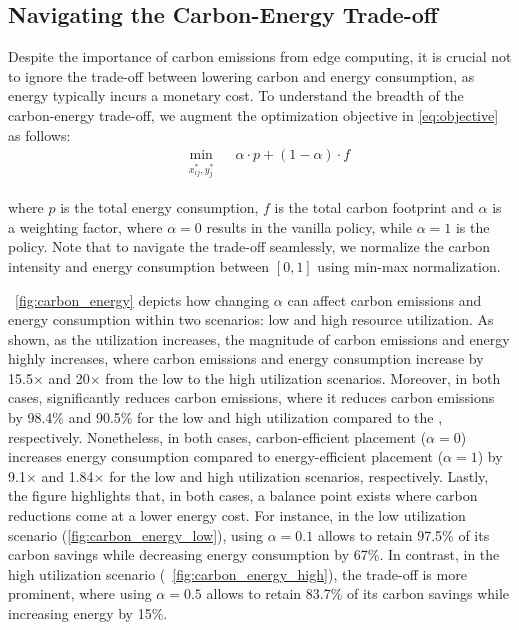 \subsection{Navigating the Carbon-Energy Trade-off}\label{sec:eval_carbon_energy}%
Despite the importance of carbon emissions from edge computing, it is crucial not to ignore the trade-off between lowering carbon and energy consumption, as energy typically incurs a monetary cost. 
To understand the breadth of the carbon-energy trade-off, we augment the optimization objective in \autoref{eq:objective} as follows:
{\small 
\begin{align}
    \label{eq:carbon_energy_tradeoff}
    & \min_{\substack{x_{ij}^*, y_j^*}} \quad \alpha \cdot p + (1-\alpha) \cdot f
\end{align}
}

where $p$ is the total energy consumption, $f$ is the total carbon footprint and $\alpha$ is a weighting factor, where $\alpha=0$ results in the vanilla \proposedsystem policy, while $\alpha=1$ is the \energyaware policy.
Note that to navigate the trade-off seamlessly, we normalize the carbon intensity and energy consumption between $ [0, 1]$ using min-max normalization.


~\autoref{fig:carbon_energy} depicts how changing $\alpha$ can affect carbon emissions and energy consumption within two scenarios: low and high resource utilization. As shown, as the utilization increases, the magnitude of carbon emissions and energy highly increases, where carbon emissions and energy consumption increase by 15.5$\times$ and 20$\times$ from the low to the high utilization scenarios. 
Moreover, in both cases, \proposedsystem significantly reduces carbon emissions, where it reduces carbon emissions by 98.4\% and 90.5\% for the low and high utilization compared to the \latencyaware, respectively. Nonetheless, in both cases, carbon-efficient placement ($\alpha=0$) increases energy consumption compared to energy-efficient placement ($\alpha=1$) by 9.1$\times$ and 1.84$\times$ for the low and high utilization scenarios, respectively.
Lastly, the figure highlights that, in both cases, a balance point exists where carbon reductions come at a lower energy cost. For instance, in the low utilization scenario (\autoref{fig:carbon_energy_low}), using $\alpha=0.1$ allows \proposedsystem to retain 97.5\% of its carbon savings while decreasing energy consumption by 67\%. In contrast, in the high utilization scenario (~\autoref{fig:carbon_energy_high}), the trade-off is more prominent, where using $\alpha=0.5$ allows \proposedsystem to retain 83.7\% of its carbon savings while increasing energy by 15\%.

